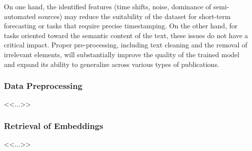On one hand, the identified features (time shifts, noise, dominance of semi-automated sources) may reduce the suitability of the dataset
for short-term forecasting or tasks that require precise timestamping. On the other hand, for tasks oriented toward the semantic content
of the text, these issues do not have a critical impact. Proper pre-processing, including text cleaning and the removal of irrelevant
elements, will substantially improve the quality of the trained model and expand its ability to generalize across various types of publications.

\subsubsection{Data Preprocessing}
<<...>>

\subsubsection{Retrieval of Embeddings}
<<...>>